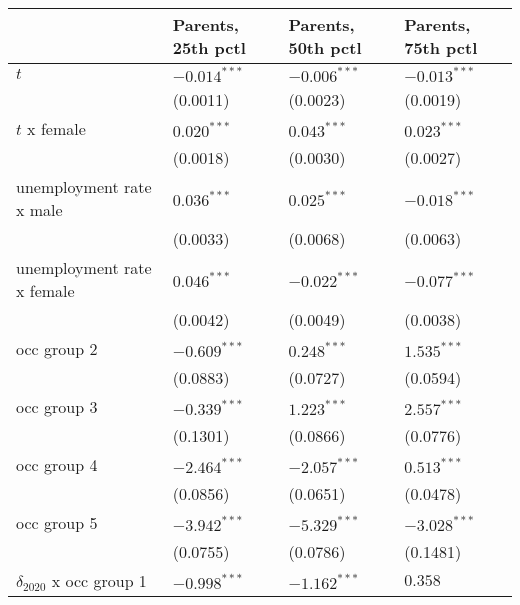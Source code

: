 \begin{tabular}{llll}
\toprule
{} & Parents, 25th pctl & Parents, 50th pctl & Parents, 75th pctl \\
\midrule
$t$                                    &     $-0.014^{***}$ &     $-0.006^{***}$ &     $-0.013^{***}$ \\
                                       &           (0.0011) &           (0.0023) &           (0.0019) \\
$t$ x female                           &      $0.020^{***}$ &      $0.043^{***}$ &      $0.023^{***}$ \\
                                       &           (0.0018) &           (0.0030) &           (0.0027) \\
unemployment rate x male               &      $0.036^{***}$ &      $0.025^{***}$ &     $-0.018^{***}$ \\
                                       &           (0.0033) &           (0.0068) &           (0.0063) \\
unemployment rate x female             &      $0.046^{***}$ &     $-0.022^{***}$ &     $-0.077^{***}$ \\
                                       &           (0.0042) &           (0.0049) &           (0.0038) \\
occ group 2                            &     $-0.609^{***}$ &      $0.248^{***}$ &      $1.535^{***}$ \\
                                       &           (0.0883) &           (0.0727) &           (0.0594) \\
occ group 3                            &     $-0.339^{***}$ &      $1.223^{***}$ &      $2.557^{***}$ \\
                                       &           (0.1301) &           (0.0866) &           (0.0776) \\
occ group 4                            &     $-2.464^{***}$ &     $-2.057^{***}$ &      $0.513^{***}$ \\
                                       &           (0.0856) &           (0.0651) &           (0.0478) \\
occ group 5                            &     $-3.942^{***}$ &     $-5.329^{***}$ &     $-3.028^{***}$ \\
                                       &           (0.0755) &           (0.0786) &           (0.1481) \\
$\delta_{2020}$ x occ group 1          &     $-0.998^{***}$ &     $-1.162^{***}$ &            $0.358$ \\

\end{tabular}
